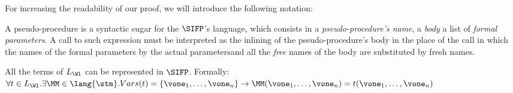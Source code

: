 For increasing the readability of our proof, we will introduce the following notation:

\begin{notation}
A pseudo-procedure is a syntactic sugar for the $\SIFP$'s language, which consists in a \emph{pseudo-procedure's name}, a \emph{body} a list of \emph{formal parameters}. A call to such expression must be interpreted as the inlining of the pseudo-procedure's body in the place of the call in which the names of the formal parameters by the actual parametersand all the \emph{free} names of the body are substituted by fresh names.
\end{notation}


\begin{lemma}
All the terms of $L_\Wl$ can be represented in $\SIFP$. Formally: $\forall t \in L_\Wl. \exists \MM\in \lang{\stm}. Vars(t)=\{\vone_1, \ldots, \vone_n\} \to \MM(\vone_1, \ldots, \vone_n)= t(\vone_1, \ldots, \vone_n)$
\end{lemma}
